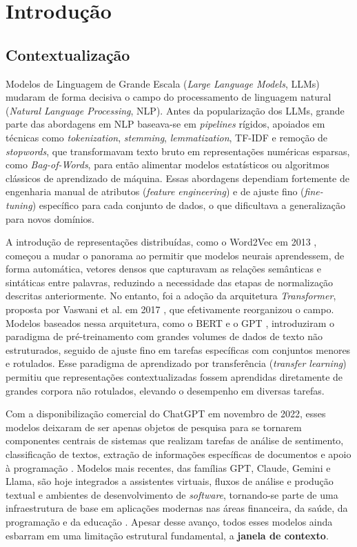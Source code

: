 \chapter{Introdução}
\label{cap:introducao}

\section{Contextualização}
\label{sec:contextualizacao}

Modelos de Linguagem de Grande Escala (\textit{Large Language Models}, LLMs) mudaram de forma decisiva o campo do processamento de linguagem natural (\textit{Natural Language Processing}, NLP). Antes da popularização dos LLMs, grande parte das abordagens em NLP baseava-se em \textit{pipelines} rígidos, apoiados em técnicas como \textit{tokenization}, \textit{stemming}, \textit{lemmatization}, TF-IDF e remoção de \textit{stopwords}, que transformavam texto bruto em representações numéricas esparsas, como \textit{Bag-of-Words}, para então alimentar modelos estatísticos ou algoritmos clássicos de aprendizado de máquina. Essas abordagens dependiam fortemente de engenharia manual de atributos (\textit{feature engineering}) e de ajuste fino (\textit{fine-tuning}) específico para cada conjunto de dados, o que dificultava a generalização para novos domínios.

A introdução de representações distribuídas, como o Word2Vec em 2013 \cite{mikolov2013word2vec}, começou a mudar o panorama ao permitir que modelos neurais aprendessem, de forma automática, vetores densos que capturavam as relações semânticas e sintáticas entre palavras, reduzindo a necessidade das etapas de normalização descritas anteriormente. No entanto, foi a adoção da arquitetura \textit{Transformer}, proposta por Vaswani et al. em 2017 \cite{vaswani2017attention}, que efetivamente reorganizou o campo. Modelos baseados nessa arquitetura, como o BERT \cite{devlin2019bert} e o GPT \cite{radford2018gpt}, introduziram o paradigma de pré-treinamento com grandes volumes de dados de texto não estruturados, seguido de ajuste fino em tarefas específicas com conjuntos menores e rotulados. Esse paradigma de aprendizado por transferência (\textit{transfer learning}) \cite{ruder2019transfer} permitiu que representações contextualizadas fossem aprendidas diretamente de grandes corpora não rotulados, elevando o desempenho em diversas tarefas.

Com a disponibilização comercial do ChatGPT em novembro de 2022, esses modelos deixaram de ser apenas objetos de pesquisa para se tornarem componentes centrais de sistemas que realizam tarefas de análise de sentimento, classificação de textos, extração de informações específicas de documentos e apoio à programação \cite{devlin2019bert,brown2020fewshot}. Modelos mais recentes, das famílias GPT, Claude, Gemini e Llama, são hoje integrados a assistentes virtuais, fluxos de análise e produção textual e ambientes de desenvolvimento de \textit{software}, tornando-se parte de uma infraestrutura de base em aplicações modernas nas áreas financeira, da saúde, da programação e da educação \cite{huynh2025codegen,scarlatos2025tutors}. Apesar desse avanço, todos esses modelos ainda esbarram em uma limitação estrutural fundamental, a \textbf{janela de contexto}.


